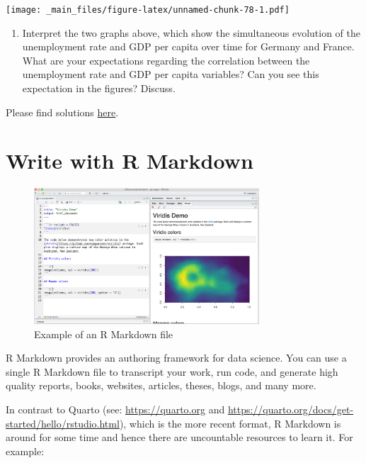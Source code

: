 \documentclass[
  12pt,
  oneside]{book}
\providecommand{\tightlist}{%
  \setlength{\itemsep}{0pt}\setlength{\parskip}{0pt}}
\theoremstyle{definition}
\theoremstyle{definition}
\theoremstyle{definition}
\theoremstyle{definition}
\theoremstyle{remark}
\begin{document}
\texttt{[image: \_main\_files/figure-latex/unnamed-chunk-78-1.pdf]}

\begin{enumerate}
\def\labelenumi{(\arabic{enumi})}
\setcounter{enumi}{23}
\tightlist
\item
  Interpret the two graphs above, which show the simultaneous evolution of the unemployment rate and GDP per capita over time for Germany and France. What are your expectations regarding the correlation between the unemployment rate and GDP per capita variables? Can you see this expectation in the figures? Discuss.
\end{enumerate}

Please find solutions \href{https://raw.githubusercontent.com/hubchev/courses/main/scr/un_gdp_ger_fra.R}{here}.

\hypertarget{write-with-r-markdown}{%
\chapter{Write with R Markdown}\label{write-with-r-markdown}}

\begin{figure}
\centering
\includegraphics[width=0.75\textwidth,height=\textheight]{fig/rmstudio.png}
\caption{\label{fig:examplermd} Example of an R Markdown file}
\end{figure}

R Markdown provides an authoring framework for data science. You can use a single
R Markdown file to transcript your work, run code, and generate high quality reports, books, websites, articles, theses, blogs, and many more.

In contrast to Quarto (see: \url{https://quarto.org} and \url{https://quarto.org/docs/get-started/hello/rstudio.html}), which is the more recent format, R Markdown is around for some time and hence there are uncountable resources to learn it. For example:
\end{document}
